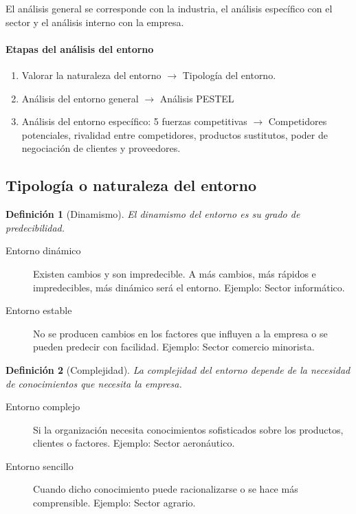 \documentclass[12pt]{article}
\theoremstyle{definition_wo_parentheses}
\newtheorem{definicion}{Definición}[section]
\begin{document}
	El análisis general se corresponde con la industria, el análisis específico con el sector y el análisis interno con la empresa.

\paragraph{Etapas del análisis del entorno}
\begin{enumerate}
\item Valorar la naturaleza del entorno $\rightarrow$ Tipología del entorno.
\item Análisis del entorno general $\rightarrow$ Análisis PESTEL
\item Análisis del entorno específico: 5 fuerzas competitivas $\rightarrow$ Competidores potenciales, rivalidad entre competidores, productos sustitutos, poder de negociación de clientes y proveedores.
\end{enumerate}

\subsection{Tipología  o naturaleza del entorno}

\begin{definicion}[Dinamismo]
El dinamismo del entorno es su grado de predecibilidad.
\end{definicion}

\begin{description}
\item[Entorno dinámico] Existen cambios y son impredecible. A más cambios, más rápidos e impredecibles, más dinámico será el entorno. Ejemplo: Sector informático.
\item[Entorno estable] No se producen cambios en los factores que influyen a la empresa o se pueden predecir con facilidad. Ejemplo: Sector comercio minorista.
\end{description}

\begin{definicion}[Complejidad]
La complejidad del entorno depende de la necesidad de conocimientos que necesita la empresa.
\end{definicion}

\begin{description}
\item[Entorno complejo]Si la organización necesita conocimientos sofisticados sobre los productos, clientes o factores. Ejemplo: Sector aeronáutico.
\item[Entorno sencillo] Cuando dicho conocimiento puede racionalizarse o se hace más comprensible. Ejemplo: Sector agrario.
\end{description}
\end{document}
